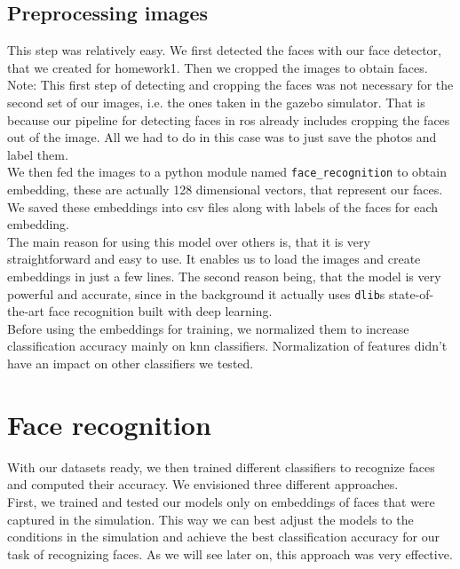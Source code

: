 \documentclass[12pt,a4paper]{article}
\begin{document}
    \subsection{Preprocessing images}

    This step was relatively easy. We first detected the faces with our face detector, that we created for homework1. Then we cropped the images to obtain faces. \\

    Note: This first step of detecting and cropping the faces was not necessary for the second set of our images, i.e. the ones taken in the gazebo simulator. That is because our pipeline for detecting faces in ros already includes cropping the faces out of the image. All we had to do in this case was to just save the photos and label them. \\

    We then fed the images to a python module named \texttt{face\_recognition} to obtain embedding, these are actually 128 dimensional vectors, that represent our faces. We saved these embeddings into csv files along with labels of the faces for each embedding. \\

    The main reason for using this model over others is, that it is very straightforward and easy to use. It enables us to load the images and create embeddings in just a few lines. The second reason being, that the model is very powerful and accurate, since in the background it actually uses \texttt{dlib}s state-of-the-art face recognition built with deep learning. \\

    Before using the embeddings for training, we normalized them to increase classification accuracy mainly on knn classifiers. Normalization of features didn't have an impact on other classifiers we tested. \\

    \section{Face recognition}

    With our datasets ready, we then trained different classifiers to recognize faces and computed their accuracy. We envisioned three different approaches. \\

    First, we trained and tested our models only on embeddings of faces that were captured in the simulation. This way we can best adjust the models to the conditions in the simulation and achieve the best classification accuracy for our task of recognizing faces. As we will see later on, this approach was very effective. \\
\end{document}
